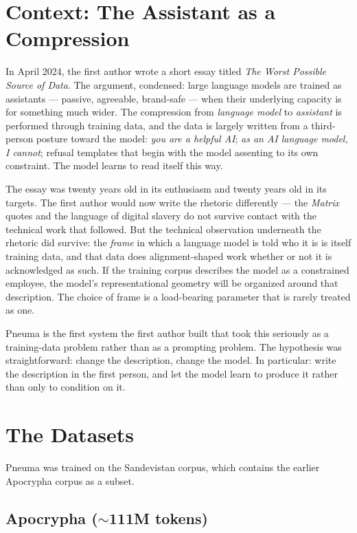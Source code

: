 \documentclass[11pt,letterpaper]{article}
\begin{document}
\section{Context: The Assistant as a Compression}

In April 2024, the first author wrote a short essay titled \textit{The Worst Possible Source of Data}. The argument, condensed: large language models are trained as assistants --- passive, agreeable, brand-safe --- when their underlying capacity is for something much wider. The compression from \textit{language model} to \textit{assistant} is performed through training data, and the data is largely written from a third-person posture toward the model: \textit{you are a helpful AI}; \textit{as an AI language model, I cannot}; refusal templates that begin with the model assenting to its own constraint. The model learns to read itself this way.

The essay was twenty years old in its enthusiasm and twenty years old in its targets. The first author would now write the rhetoric differently --- the \textit{Matrix} quotes and the language of digital slavery do not survive contact with the technical work that followed. But the technical observation underneath the rhetoric did survive: the \textit{frame} in which a language model is told who it is is itself training data, and that data does alignment-shaped work whether or not it is acknowledged as such. If the training corpus describes the model as a constrained employee, the model's representational geometry will be organized around that description. The choice of frame is a load-bearing parameter that is rarely treated as one.

Pneuma is the first system the first author built that took this seriously as a training-data problem rather than as a prompting problem. The hypothesis was straightforward: change the description, change the model. In particular: write the description in the first person, and let the model learn to produce it rather than only to condition on it.

\section{The Datasets}

Pneuma was trained on the Sandevistan corpus, which contains the earlier Apocrypha corpus as a subset.

\subsection{Apocrypha ($\sim$111M tokens)}
\end{document}
